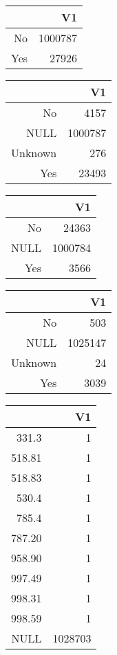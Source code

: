 \bigskip\bigskip
\centering
\begin{tabular}{rr}
  \hline
 & V1 \\ 
  \hline
No & 1000787 \\ 
  Yes & 27926 \\ 
   \hline
\end{tabular}

\bigskip\bigskip
\centering
\begin{tabular}{rr}
  \hline
 & V1 \\ 
  \hline
No & 4157 \\ 
  NULL & 1000787 \\ 
  Unknown & 276 \\ 
  Yes & 23493 \\ 
   \hline
\end{tabular}

\bigskip\bigskip
\centering
\begin{tabular}{rr}
  \hline
 & V1 \\ 
  \hline
No & 24363 \\ 
  NULL & 1000784 \\ 
  Yes & 3566 \\ 
   \hline
\end{tabular}

\bigskip\bigskip
\centering
\begin{tabular}{rr}
  \hline
 & V1 \\ 
  \hline
No & 503 \\ 
  NULL & 1025147 \\ 
  Unknown &  24 \\ 
  Yes & 3039 \\ 
   \hline
\end{tabular}

\bigskip\bigskip
\centering
\begin{tabular}{rr}
  \hline
 & V1 \\ 
  \hline
331.3 &   1 \\ 
  518.81 &   1 \\ 
  518.83 &   1 \\ 
  530.4 &   1 \\ 
  785.4 &   1 \\ 
  787.20 &   1 \\ 
  958.90 &   1 \\ 
  997.49 &   1 \\ 
  998.31 &   1 \\ 
  998.59 &   1 \\ 
  NULL & 1028703 \\ 
   \hline
\end{tabular}

